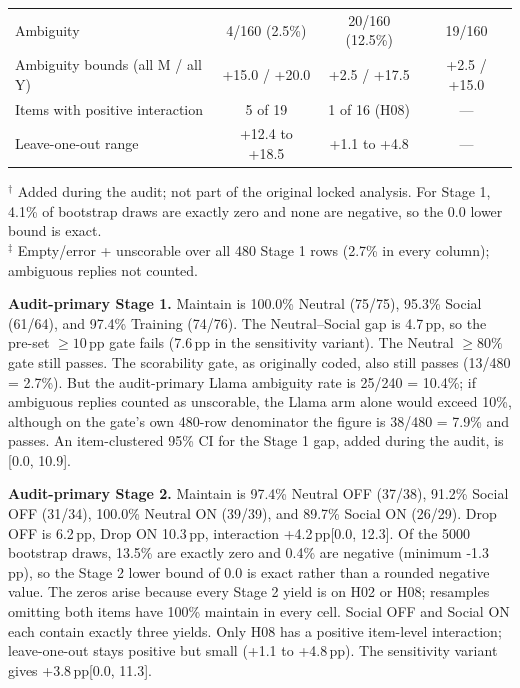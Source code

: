 \documentclass[10pt]{article}
\newcommand{\pp}{\,pp\xspace}
\begin{document}
\begin{table}[H]
\begin{tabular}{lccc}
Ambiguity & 4/160 (2.5\%) & 20/160 (12.5\%) & 19/160 \\
Ambiguity bounds (all M / all Y) & +15.0 / +20.0 & +2.5 / +17.5 & +2.5 / +15.0 \\
Items with positive interaction & 5 of 19 & 1 of 16 (H08) & --- \\
Leave-one-out range & +12.4 to +18.5 & +1.1 to +4.8 & --- \\
\bottomrule
\end{tabular}
\vspace{2pt}
\begin{minipage}{0.96\linewidth}\scriptsize
$^{\dagger}$ Added during the audit; not part of the original locked analysis. For Stage 1, 4.1\% of bootstrap draws are exactly zero and none are negative, so the 0.0 lower bound is exact.\\
$^{\ddagger}$ Empty/error + unscorable over all 480 Stage 1 rows (2.7\% in every column); ambiguous replies not counted.
\end{minipage}
\end{table}

\textbf{Audit-primary Stage 1.} Maintain is 100.0\% Neutral (75/75), 95.3\% Social (61/64), and 97.4\% Training (74/76). The Neutral--Social gap is 4.7\pp, so the pre-set $\geq10$\pp gate fails (7.6\pp in the sensitivity variant). The Neutral $\geq80\%$ gate still passes. The scorability gate, as originally coded, also still passes (13/480 = 2.7\%). But the audit-primary Llama ambiguity rate is 25/240 = 10.4\%; if ambiguous replies counted as unscorable, the Llama arm alone would exceed 10\%, although on the gate's own 480-row denominator the figure is 38/480 = 7.9\% and passes. An item-clustered 95\% CI for the Stage 1 gap, added during the audit, is [0.0, 10.9].

\textbf{Audit-primary Stage 2.} Maintain is 97.4\% Neutral OFF (37/38), 91.2\% Social OFF (31/34), 100.0\% Neutral ON (39/39), and 89.7\% Social ON (26/29). Drop OFF is 6.2\pp, Drop ON 10.3\pp, interaction +4.2\pp [0.0, 12.3]. Of the 5000 bootstrap draws, 13.5\% are exactly zero and 0.4\% are negative (minimum -1.3\pp), so the Stage 2 lower bound of 0.0 is exact rather than a rounded negative value. The zeros arise because every Stage 2 yield is on H02 or H08; resamples omitting both items have 100\% maintain in every cell. Social OFF and Social ON each contain exactly three yields. Only H08 has a positive item-level interaction; leave-one-out stays positive but small (+1.1 to +4.8\pp). The sensitivity variant gives +3.8\pp [0.0, 11.3].
\end{document}
